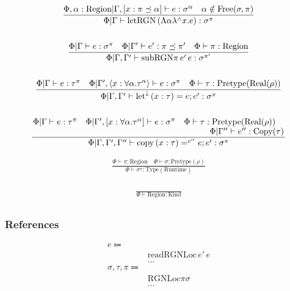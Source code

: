 \documentclass {article}
\begin{document}
\begin{gather*}
\frac
{\Phi , \alpha : \text{Region} | \Gamma, [x : \pi \preceq \alpha] \vdash e : \sigma^\alpha \quad \alpha \notin \text{Free}(\sigma, \pi)}
{\Phi | \Gamma \vdash \text{letRGN} \, (\Lambda \alpha \lambda^\wedge x. e) : \sigma^\pi} \\
\\
\frac
{\Phi | \Gamma \vdash e : \sigma^\pi \quad \Phi | \Gamma' \vdash e' : \pi \preceq \pi' \quad \Phi \vdash \pi : \text{Region}}
{\Phi | \Gamma, \Gamma' \vdash \text{subRGN} \pi \, e' \, e : \sigma^{\pi'} } \\
\\
\frac
{\Phi | \Gamma \vdash e : \tau^\pi \quad \Phi | \Gamma', \langle x : \forall \alpha. \tau^\alpha \rangle \vdash e : \sigma^\pi \quad \Phi \vdash \tau : \text{Pretype}(\text{Real}(\rho))}
{\Phi | \Gamma, \Gamma' \vdash \text{let}^\downarrow \, (x : \tau) = e; e' : \sigma^\pi} \\
\\
\frac
{\splitfrac{\Phi | \Gamma \vdash e : \tau^\pi \quad \Phi | \Gamma', [ x : \forall \alpha. \tau^\alpha ] \vdash e : \sigma^\pi \quad \Phi \vdash \tau : \text{Pretype}(\text{Real}(\rho))}
{\Phi | \Gamma'' \vdash e'' : \text{Copy}(\tau)}}
{\Phi | \Gamma, \Gamma', \Gamma'' \vdash \text{copy} \, (x : \tau) =^{e''} e; e' : \sigma^\pi} \\
\end{gather*}

\begin{gather*}
\frac
{\Phi \vdash \pi : \text{Region} \quad \Phi \vdash \sigma : \text{Pretype}(\rho)}
{\Phi \vdash \sigma^\pi : \text{Type}(\text{Runtime})} \\
\end{gather*}

\begin{gather*}
\frac
{}
{\Phi \vdash \text{Region} : \text{Kind}} \\
\end{gather*}

\subsubsection{References}
\begin{align*}
e \Coloneqq & \\
& \text{readRGNLoc} \, e' \, e \tag{Dereference Pointer} \\
& \dots \\
\sigma, \tau, \pi \Coloneqq & \\
& \text{RGNLoc} \pi \sigma \tag{Reference} \\
& \dots \\
\end{align*}
\end{document}
